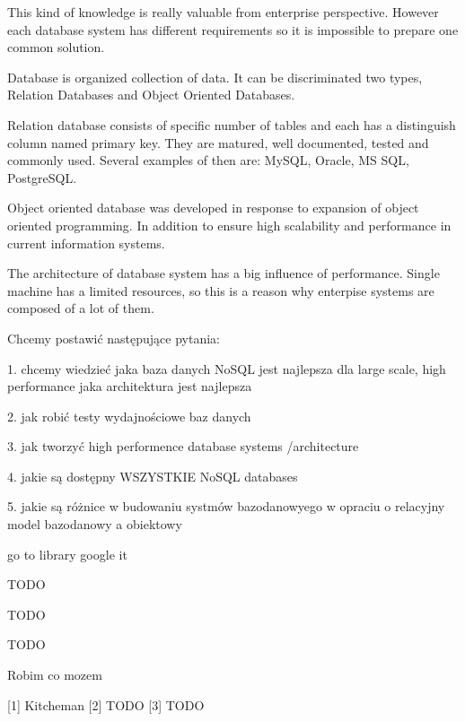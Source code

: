 \documentclass[times, 10pt,twocolumn]{article}
\begin{document}
This kind of knowledge is really valuable from enterprise perspective. However each database
system has different requirements so it is impossible to prepare one common solution.
 

Database is organized collection of data. It can be discriminated two types, 
Relation Databases and Object Oriented Databases.

Relation database consists of specific number of tables and each has a distinguish column named primary key. 
They are matured, well documented, tested and commonly used. Several examples of then are: MySQL, Oracle, MS SQL, PostgreSQL. 

Object oriented database was developed in response to expansion of object oriented programming. In addition to ensure high scalability and  
performance in current information systems.

The architecture of database system has a big influence of performance. Single machine has a limited
resources, so this is a reason why enterpise systems  are composed of a lot of them.


Chcemy postawić następujące pytania:

1. chcemy wiedzieć jaka baza danych NoSQL jest najlepsza dla large scale, high performance
jaka architektura jest najlepsza

2. jak robić testy wydajnościowe baz danych

3. jak tworzyć high performence database systems /architecture

4. jakie są dostępny WSZYSTKIE NoSQL databases

5. jakie są różnice w budowaniu systmów bazodanowyego w opraciu o relacyjny model bazodanowy a obiektowy



go to library
google it


TODO


TODO



TODO


Robim co mozem

[1] Kitcheman
[2] TODO
[3] TODO


\nocite{ex1,ex2}


\end{document}
